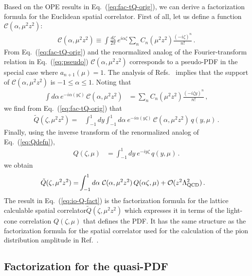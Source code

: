 \documentclass[prd,aps,twocolumn,preprintnumbers,showpacs,nofootinbib,superscriptaddress,notitlepage]{revtex4-1}
\newcommand{\nn}{\nonumber}
\newcommand{\spcorr}{spatial correlator\xspace}
\DeclareRobustCommand{\eq}[1]{Eq.~(\ref{eq:#1})}
\begin{document}
Based on the OPE results in Eq.~(\ref{eq:fac-tQ-orig}), we can  derive a  factorization formula for the Euclidean \spcorr. First of all, let us
define a function $\mathcal{C} (\alpha, {\mu}^2 z^2)$:
\begin{align}  \label{eq:fac-C}
\mathcal{C} (\alpha, {\mu}^2 z^2) \equiv \int\! \frac{d \zeta}{2 \pi} \,
 e^{i \alpha \zeta}  \sum_n C_n ({\mu}^2 z^2)  \frac{(-i \zeta)^n}{n!}
 \,.
\end{align}
From \eq{fac-tQ-orig} and the renormalized analog of the Fourier-transform relation in \eq{pseudo} $\mathcal{C}(\alpha,\mu^2z^2)$ corresponds to a pseudo-PDF in the special case where $a_{n+1}(\mu)=1$. The analysis of Refs.~\cite{Radyushkin:1983wh,Radyushkin:2016hsy} implies that the support of $\mathcal{C}(\alpha,\mu^2z^2)$ is $-1 \le \alpha \le 1$. Noting that
\begin{align}
  \int d\alpha\, e^{-i\alpha(y \zeta)}\, \mathcal{C} (\alpha, {\mu}^2 z^2)
   &= \sum_n C_n(\mu^2 z^2) \frac{(-i\zeta y)^n}{n!} \,,
\end{align}
we find from \eq{fac-tQ-orig} that
\begin{align}
\tilde{Q}(\zeta,\mu^2 z^2)
= &\int_{-1}^1\!\! dy\int_{-1}^1\!\! d\alpha\ e^{-i\alpha(y\zeta)}\, \mathcal{C}(\alpha,\mu^2z^2)\, q(y,\mu) \,.
\end{align}
Finally, using the inverse transform of the renormalized analog of \eq{Qdefn},
\begin{align} \label{eq:FTq}
Q(\zeta,\mu) &= \int_{-1}^1\!\! dy\: e^{-i y\zeta}\,
  q(y,\mu) \,.
\end{align}
we obtain
\begin{align} \label{eq:io-Q-fact}
\tilde{Q}(\zeta,\mu^2 z^2)
=& \int_{-1}^1 d\alpha\ \mathcal{C}(\alpha,\mu^2z^2)\, Q(\alpha \zeta,\mu)
 + {\cal O}(z^2\Lambda_{\rm QCD}^2)
\,.
\end{align}
The result in \eq{io-Q-fact} is the factorization formula for the lattice calculable \spcorr $\tilde Q(\zeta,\mu^2 z^2)$ which expresses it in terms of the light-cone correlation $Q(\zeta,\mu)$ that defines the PDF. It has the same structure as the factorization formula for the \spcorr used for the calculation of the pion distribution amplitude in Ref.~\cite{Braun:2007wv,Bali:2017gfr}.

\subsection{Factorization for the quasi-PDF}
\end{document}

